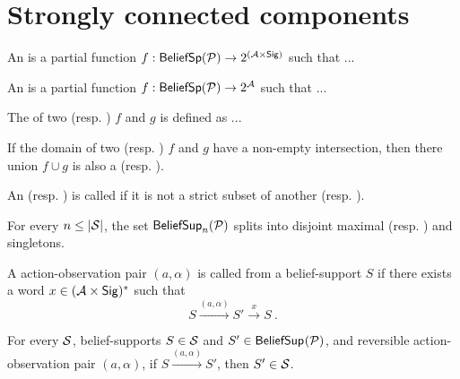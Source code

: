 %
\section{Strongly connected components}
%
\begin{definition}
%
An \emphdef{\aodscc} is a partial function $f : \bsp{\pdp} \to 2^{(\ac\times\sig)}$ such that ...
\end{definition}
%
\begin{definition}
%
An \emphdef{\adscc} is a partial function $f : \bsp{\pdp} \to 2^{\ac}$ such that ...
%
\end{definition}
%
\begin{definition}
The  of two \adscc (resp. \aodscc) $f$ and $g$ is defined as ...
\end{definition}
%
\begin{lemma}
If the domain of two \adscc{} (resp. \aodscc) $f$ and $g$ have a non-empty intersection,
then there union $f\cup g$ is also a \adscc{} (resp. \aodscc).
\end{lemma}
%
\begin{definition}
An \adscc{} (resp. \aodscc) is called  if it is not a strict subset of another \adscc{} (resp. \aodscc).
\end{definition}
%
\begin{corollary}
For every $n\leq |\st|$, the set $\bsup[n]{\pdp}$ splits into disjoint maximal \adscc{} (resp. \aodscc) and singletons.
\end{corollary}
%
\begin{definition}
A action-observation pair $(a,\alpha)$ is called  from a belief-support $S$ if there exists a word $x\in (\ac\times\sig)^*$ such that
\[
S \xrightarrow{(a,\alpha)} S' \xrightarrow{x} S \ .
\]
\end{definition}
%
\begin{lemma}
For every \aodscc{} $\cS$, belief-supports $S\in \cS$ and $S'\in \bsup{\pdp}$, and reversible action-observation pair $(a,\alpha)$,
if $S \xrightarrow{(a,\alpha)} S'$,
then $S' \in\cS$.
\end{lemma}
%